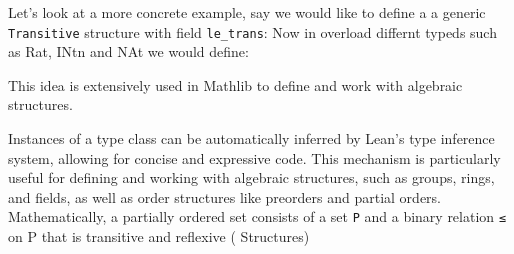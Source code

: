 Let's look at a more concrete example, say we would like to define a a generic \lstinline[language=lean]|Transitive| 
structure with field \lstinline[language=lean]|le_trans|:
Now in overload differnt typeds such as Rat, INtn and NAt we would define:




This idea is extensively used in Mathlib to define and work with algebraic structures.

Instances of a type class can be automatically inferred by Lean's type inference system,
allowing for concise and expressive code.
This mechanism is particularly useful for defining and working with algebraic structures,
such as groups, rings, and fields, as well as order structures like preorders and partial orders.
Mathematically, a partially ordered set consists of a set \lstinline[language=lean]|P| 
and a binary relation 
\lstinline[language=lean]|≤| 
on P that is transitive and reflexive (\cite{mathinlean} Structures)



